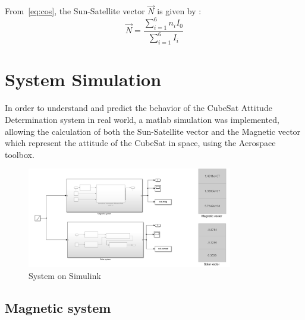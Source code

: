 \documentclass[a4paper, 12pt]{article}
\begin{document}
\begin{itemize}

\vspace{1cm}
From~\eqref{eq:cos}, the Sun-Satellite vector $\vec{N}$ is given by : 
\begin{equation} \label{eq:N}
\vec{N}= \frac{\sum_{i=1}^{6} n_i I_0}{\sum_{i=1}^{6} I_i}
\end{equation}





\end{itemize}

\section{System Simulation}
In order to understand and predict the behavior of the CubeSat Attitude Determination system in real world, a matlab simulation was implemented, allowing the calculation of both the Sun-Satellite vector and the Magnetic vector which represent the attitude of the CubeSat in space, using the Aerospace toolbox.


\begin{figure}[H]  %
    \centering
    \includegraphics[width=0.8\textwidth]{fig/matlabSimu.png}
    \caption{System on Simulink}
    \label{fig:System on Simulink}
\end{figure}

\subsection{Magnetic system}
\end{document}

